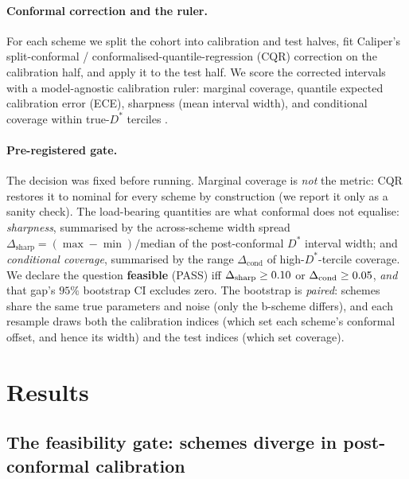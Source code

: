 \documentclass[11pt]{article}
\newcommand{\Dstar}{D^{*}}
\begin{document}
\paragraph{Conformal correction and the ruler.}
For each scheme we split the cohort into calibration and test halves, fit Caliper's
split-conformal / conformalised-quantile-regression (CQR) correction
\cite{romano2019cqr} on the calibration half, and apply it to the test half. We score
the corrected intervals with a model-agnostic calibration ruler: marginal coverage,
quantile expected calibration error (ECE), sharpness (mean interval width), and
conditional coverage within true-$\Dstar$ terciles \cite{gneiting2007scoring,kuleshov2018calibrated}.

\paragraph{Pre-registered gate.}
The decision was fixed before running. Marginal coverage is \emph{not} the metric: CQR
restores it to nominal for every scheme by construction (we report it only as a sanity
check). The load-bearing quantities are what conformal does not equalise:
\emph{sharpness}, summarised by the across-scheme width spread
$\Delta_{\mathrm{sharp}}=(\max-\min)/\mathrm{median}$ of the post-conformal $\Dstar$
interval width; and \emph{conditional coverage}, summarised by the range
$\Delta_{\mathrm{cond}}$ of high-$\Dstar$-tercile coverage. We declare the question
\textbf{feasible} (PASS) iff $\Delta_{\mathrm{sharp}}\ge0.10$ or
$\Delta_{\mathrm{cond}}\ge0.05$, \emph{and} that gap's $95\%$ bootstrap CI
excludes zero. The bootstrap is \emph{paired}: schemes share the same true parameters
and noise (only the b-scheme differs), and each resample draws both the calibration
indices (which set each scheme's conformal offset, and hence its width) and the test
indices (which set coverage).

\section{Results}

\subsection{The feasibility gate: schemes diverge in post-conformal calibration}
\label{sec:gate}
\end{document}
